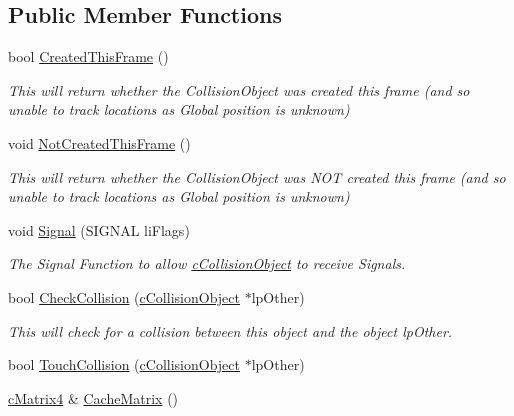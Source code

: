 \subsection*{Public Member Functions}
\begin{DoxyCompactItemize}
\item 
\hypertarget{classc_collision_object_ac56988f3641d39409fbf4ccba3525282}{
bool \hyperlink{classc_collision_object_ac56988f3641d39409fbf4ccba3525282}{CreatedThisFrame} ()}
\label{classc_collision_object_ac56988f3641d39409fbf4ccba3525282}

\begin{DoxyCompactList}\small\item\em This will return whether the CollisionObject was created this frame (and so unable to track locations as Global position is unknown) \end{DoxyCompactList}\item 
\hypertarget{classc_collision_object_a31156a5bfff63de45daa32893a30697c}{
void \hyperlink{classc_collision_object_a31156a5bfff63de45daa32893a30697c}{NotCreatedThisFrame} ()}
\label{classc_collision_object_a31156a5bfff63de45daa32893a30697c}

\begin{DoxyCompactList}\small\item\em This will return whether the CollisionObject was NOT created this frame (and so unable to track locations as Global position is unknown) \end{DoxyCompactList}\item 
\hypertarget{classc_collision_object_abec1a68ab54f2e80244c8b336bca3626}{
void \hyperlink{classc_collision_object_abec1a68ab54f2e80244c8b336bca3626}{Signal} (SIGNAL liFlags)}
\label{classc_collision_object_abec1a68ab54f2e80244c8b336bca3626}

\begin{DoxyCompactList}\small\item\em The Signal Function to allow \hyperlink{classc_collision_object}{cCollisionObject} to receive Signals. \end{DoxyCompactList}\item 
bool \hyperlink{classc_collision_object_a6f5b5341a726cb0a54fe3271b110dc8c}{CheckCollision} (\hyperlink{classc_collision_object}{cCollisionObject} $\ast$lpOther)
\begin{DoxyCompactList}\small\item\em This will check for a collision between this object and the object lpOther. \end{DoxyCompactList}\item 
bool \hyperlink{classc_collision_object_a1d93858e03da25f8656ae688c4dedbce}{TouchCollision} (\hyperlink{classc_collision_object}{cCollisionObject} $\ast$lpOther)
\item 
\hypertarget{classc_collision_object_abc47ab584910cc877b5e723be4e09eac}{
\hyperlink{classc_matrix4}{cMatrix4} \& \hyperlink{classc_collision_object_abc47ab584910cc877b5e723be4e09eac}{CacheMatrix} ()}
\label{classc_collision_object_abc47ab584910cc877b5e723be4e09eac}


\end{DoxyCompactItemize}
